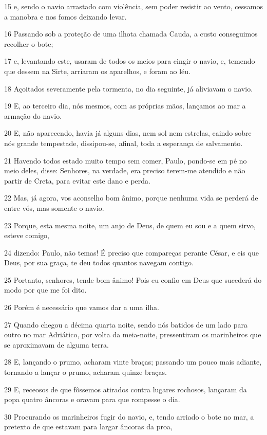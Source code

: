 \par 15 e, sendo o navio arrastado com violência, sem poder resistir ao vento, cessamos a manobra e nos fomos deixando levar.
\par 16 Passando sob a proteção de uma ilhota chamada Cauda, a custo conseguimos recolher o bote;
\par 17 e, levantando este, usaram de todos os meios para cingir o navio, e, temendo que dessem na Sirte, arriaram os aparelhos, e foram ao léu.
\par 18 Açoitados severamente pela tormenta, no dia seguinte, já aliviavam o navio.
\par 19 E, ao terceiro dia, nós mesmos, com as próprias mãos, lançamos ao mar a armação do navio.
\par 20 E, não aparecendo, havia já alguns dias, nem sol nem estrelas, caindo sobre nós grande tempestade, dissipou-se, afinal, toda a esperança de salvamento.
\par 21 Havendo todos estado muito tempo sem comer, Paulo, pondo-se em pé no meio deles, disse: Senhores, na verdade, era preciso terem-me atendido e não partir de Creta, para evitar este dano e perda.
\par 22 Mas, já agora, vos aconselho bom ânimo, porque nenhuma vida se perderá de entre vós, mas somente o navio.
\par 23 Porque, esta mesma noite, um anjo de Deus, de quem eu sou e a quem sirvo, esteve comigo,
\par 24 dizendo: Paulo, não temas! É preciso que compareças perante César, e eis que Deus, por sua graça, te deu todos quantos navegam contigo.
\par 25 Portanto, senhores, tende bom ânimo! Pois eu confio em Deus que sucederá do modo por que me foi dito.
\par 26 Porém é necessário que vamos dar a uma ilha.
\par 27 Quando chegou a décima quarta noite, sendo nós batidos de um lado para outro no mar Adriático, por volta da meia-noite, pressentiram os marinheiros que se aproximavam de alguma terra.
\par 28 E, lançando o prumo, acharam vinte braças; passando um pouco mais adiante, tornando a lançar o prumo, acharam quinze braças.
\par 29 E, receosos de que fôssemos atirados contra lugares rochosos, lançaram da popa quatro âncoras e oravam para que rompesse o dia.
\par 30 Procurando os marinheiros fugir do navio, e, tendo arriado o bote no mar, a pretexto de que estavam para largar âncoras da proa,
